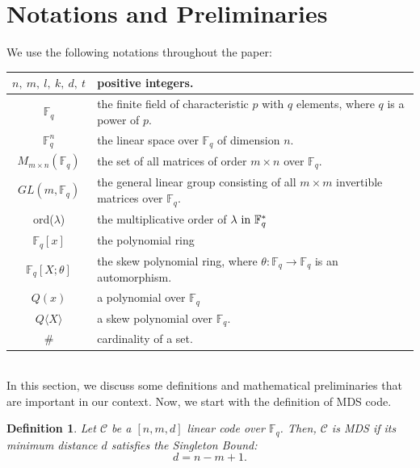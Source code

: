 \documentclass[12pt]{article}
\newtheorem{definition}{Definition}
\begin{document}
\section{\textbf{Notations and Preliminaries}}
We use the following notations throughout the paper:
\begin{table}[h]
	\centering
	\begin{tabular}{c p{10cm}}
		\hline
		$n,~m,~l,~k,~d,~t$& positive integers.\\
		\hline
		$\mathbb{F}_{q}$ &  the finite field of characteristic $p$ with $q$ elements, where $q$ is a  power of $p$. \\
		\hline
		$\mathbb{F}^n_{q}$&  the linear space over $\mathbb{F}_{q}$ of dimension $n$.\\
		\hline
		$M_{m\times n}(\mathbb{F}_{q})$ & the set of all   matrices of order $m\times n$  over   $\mathbb{F}_{q}$. \\
		\hline
		$GL(m,\mathbb{F}_q)$&  the general linear group consisting of all $m \times m$ invertible matrices over $\mathbb{F}_q$. \\
		\hline
		ord($\lambda$) & the multiplicative order of $\lambda \textup{ in } \mathbb{F}^*_{q}$\\
		\hline
		$\mathbb{F}_q[x]$& the polynomial ring \\
		\hline
		$\mathbb{F}_q[X;\theta]$& the skew polynomial ring, where $\theta:\mathbb{F}_q\longrightarrow \mathbb{F}_q$ is an automorphism. \\
		\hline
		$Q(x)$ &a polynomial over $\mathbb{F}_{q}$\\
		\hline
		$Q\langle X \rangle$ & a skew polynomial over $\mathbb{F}_{q}$. \\
		\hline
		$\#$&cardinality of a set.\\
		\hline
		\hline
	\end{tabular}
\end{table}\\
 In this section, we discuss some definitions and mathematical preliminaries that are
important in our context.  Now, we start with the definition of MDS code.

\begin{definition}\cite[ Definition 1.5 ]{dougherty2017algebraic}
	Let $\mathcal{C}$ be a \([n, m, d]\) linear code over \( \mathbb{F}_q \). Then, $\mathcal{C}$ is \emph{MDS} if its minimum distance \( d \) satisfies the Singleton Bound:
	\[
	d = n - m + 1.
	\]
\end{definition}
\end{document}
